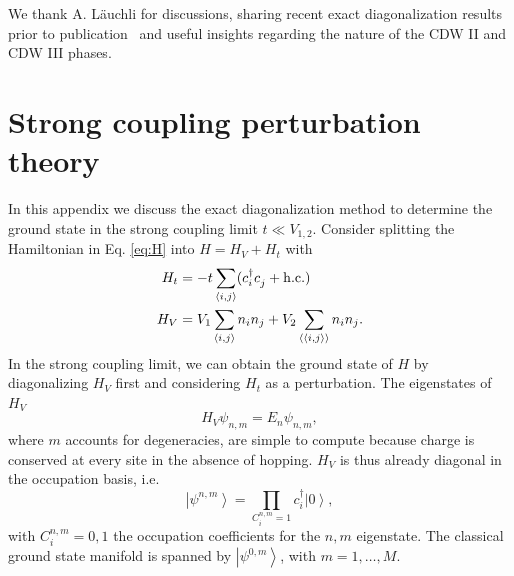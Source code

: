 \documentclass[aps,prx,10pt,twocolumn,floatfix,superscriptaddress,showpacs,numerical,footinbib]{revtex4-1}
\begin{document}
We thank A. L\"auchli for discussions, sharing recent exact diagonalization results prior to publication~\cite{CL15}
and useful insights regarding the nature of the CDW II and CDW III phases.

\appendix

\section{\label{sec:appendix} Strong coupling perturbation theory}

In this appendix we discuss the exact diagonalization method to determine the ground state in the strong coupling limit $t \ll V_{1,2}$. 
%
Consider splitting the Hamiltonian in Eq. \eqref{eq:H} into $H =H_V + H_t$ with
\begin{align}
%
 H_t &=-t\sum_{\left\langle i,j\right\rangle}(c^{\dagger}_{i}c^{\vphantom{\dagger}}_{j}+ \mathrm{h.c.}) \\
H_V &= V_{1}\sum_{\left\langle i,j\right\rangle }n_{i}n_{j}+
%
V_{2}\sum_{\left\langle \left\langle i,j\right\rangle \right\rangle }n_{i}n_{j}. 
%
\label{eq:Hsplit}
\end{align}
%
In the strong coupling limit, we can obtain the ground state of $H$ by diagonalizing $H_V$ first and considering $H_t$ as a perturbation. 
%
The eigenstates of $H_V$
\begin{equation}
H_V \psi_{n,m} = E_n \psi_{n,m},
\end{equation}
where $m$ accounts for degeneracies, are simple to compute because charge is conserved at every site in the absence of hopping. 
%
$H_V$ is thus already diagonal in the occupation basis, i.e.
\begin{equation}
\left| \psi^{n,m}\right> = \prod_{C^{n,m}_i = 1} c^\dagger_i \left|0\right>,
\end{equation}
%
 with $C^{n,m}_i=0,1$ the occupation coefficients for the $n,m$ eigenstate. 
The classical ground state manifold is spanned by $\left|\psi^{0,m}\right>$, with $m=1,\dots,M$.   
\end{document}
